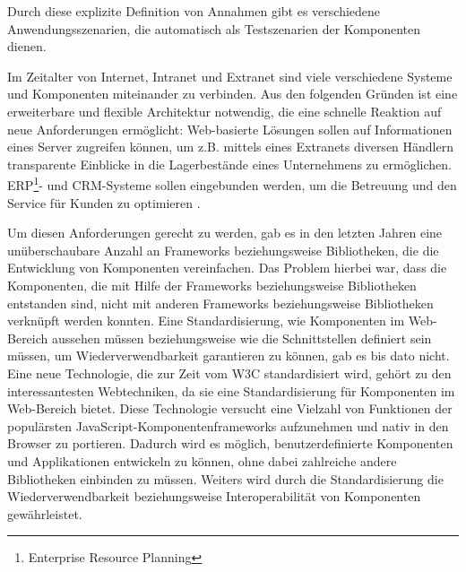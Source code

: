 Durch diese explizite Definition von Annahmen gibt es verschiedene Anwendungsszenarien, die automatisch als Testszenarien der Komponenten dienen.

Im Zeitalter von Internet, Intranet und Extranet sind viele verschiedene Systeme und Komponenten miteinander zu verbinden. Aus den folgenden Gründen ist eine erweiterbare und flexible Architektur notwendig, die eine schnelle Reaktion auf neue Anforderungen ermöglicht: Web-basierte Lösungen sollen auf Informationen eines Server zugreifen können, um z.B. mittels eines Extranets diversen Händlern transparente Einblicke in die Lagerbestände eines Unternehmens zu ermöglichen. ERP\footnote{Enterprise Resource Planning}- und CRM-Systeme sollen eingebunden werden, um die Betreuung und den Service für Kunden zu optimieren \citereset \autocite[siehe][S. 39-42]{Andresen.2003}.

Um diesen Anforderungen gerecht zu werden, gab es in den letzten Jahren eine unüberschaubare Anzahl an Frameworks beziehungsweise Bibliotheken, die die Entwicklung von Komponenten vereinfachen. Das Problem hierbei war, dass die Komponenten, die mit Hilfe der Frameworks beziehungsweise Bibliotheken entstanden sind, nicht mit anderen Frameworks beziehungsweise Bibliotheken verknüpft werden konnten. Eine Standardisierung, wie Komponenten im Web-Bereich aussehen müssen beziehungsweise wie die Schnittstellen definiert sein müssen, um Wiederverwendbarkeit garantieren zu können, gab es bis dato nicht. Eine neue Technologie, die zur Zeit vom W3C standardisiert wird, gehört zu den interessantesten Webtechniken, da sie eine Standardisierung für Komponenten im Web-Bereich bietet. Diese Technologie versucht eine Vielzahl von Funktionen der populärsten JavaScript-Komponentenframeworks aufzunehmen und nativ in den Browser zu portieren. Dadurch wird es möglich, benutzerdefinierte Komponenten und Applikationen entwickeln zu können, ohne dabei zahlreiche andere Bibliotheken einbinden zu müssen. Weiters wird durch die Standardisierung die Wiederverwendbarkeit beziehungsweise Interoperabilität von Komponenten gewährleistet.


